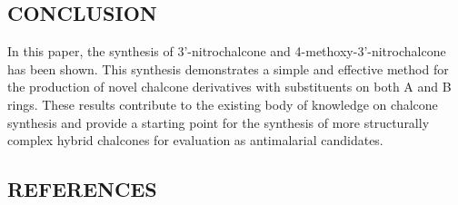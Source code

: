 \documentclass[11pt]{article}
\begin{document}
\subsection*{CONCLUSION}
In this paper, the synthesis of 3'-nitrochalcone and 4-methoxy-3'-nitrochalcone has been shown. This synthesis  demonstrates a simple and effective method for the production of novel chalcone derivatives with substituents on both A and B rings. These results contribute to the existing body of knowledge on chalcone synthesis and provide a starting point for the synthesis of more structurally complex hybrid chalcones for evaluation as antimalarial candidates.

\newpage
\subsection*{REFERENCES}
\vspace{2mm}


\setcounter{figure}{0}
\newpage
\end{document}
